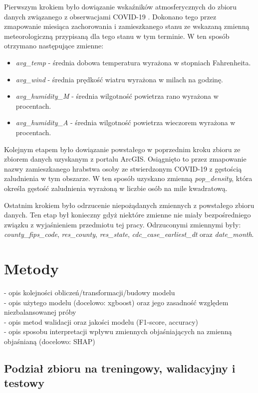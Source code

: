 \documentclass[polish, twoside, 12pt, a4paper]{article}
\theoremstyle{definition}
\theoremstyle{plain}
\theoremstyle{remark}
\begin{document}
Pierwszym krokiem było dowiązanie wskaźników atmosferycznych do zbioru danych związanego z obserwacjami COVID-19 . Dokonano tego przez zmapowanie miesiąca zachorowania i zamieszkanego stanu ze wskazaną zmienną meteorologiczną przypisaną dla tego stanu w tym terminie. W ten sposób otrzymano następujące zmienne:
\begin{itemize}
  \item \emph{avg\_temp} - średnia dobowa temperatura wyrażona w stopniach Fahrenheita.
  \item \emph{avg\_wind} - średnia prędkość wiatru wyrażona w milach na godzinę.
  \item \emph{avg\_humidity\_M} - średnia wilgotność powietrza rano wyrażona w procentach.
  \item \emph{avg\_humidity\_A} - średnia wilgotność powietrza wieczorem wyrażona w procentach.
\end{itemize}

Kolejnym etapem było dowiązanie powstałego w poprzednim kroku zbioru ze zbiorem danych uzyskanym z portalu ArcGIS. Osiągnięto to przez zmapowanie nazwy zamieszkanego hrabstwa osoby ze stwierdzonym COVID-19 z gęstością zaludnienia w tym obszarze. W ten sposób uzyskano zmienną \emph{pop\_density}, która określa gęstość zaludnienia wyrażoną w liczbie osób na mile kwadratową.

Ostatnim krokiem było odrzucenie niepożądanych zmiennych z powstałego zbioru danych. Ten etap był konieczny gdyż niektóre zmienne nie miały bezpośredniego związku z wyjaśnieniem przedmiotu tej pracy. Odrzuconymi zmiennymi były:  \emph{county\_fips\_code},  \emph{res\_county}, \emph{res\_state}, \emph{cdc\_case\_earliest\_dt} oraz \emph{date\_month}.


\clearpage
\section{Metody}

- opis kolejności obliczeń/transformacji/budowy modelu \\
- opis użytego modelu (docelowo: xgboost) oraz jego zasadność względem niezbalansowanej próby\\
- opis metod walidacji oraz jakości modelu (F1-score, accuracy) \\
- opis sposobu interpretacji wpływu zmiennych objaśniających na zmienną objaśnianą (docelowo: SHAP)

\subsection{Podział zbioru na treningowy, walidacyjny i testowy}
\end{document}
